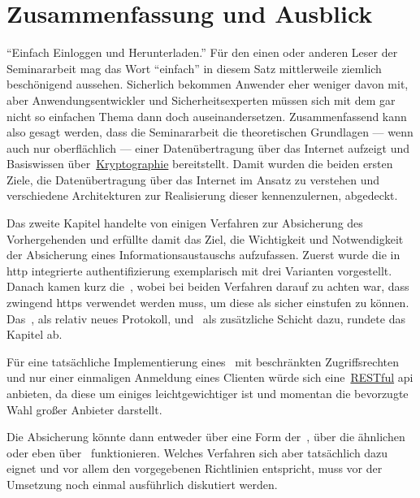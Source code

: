 \section{Zusammenfassung und Ausblick}\label{sec:zusammenfassung-und-ausblick}
	\enquote{Einfach Einloggen und Herunterladen.}
	Für den einen oder anderen Leser der Seminararbeit mag das Wort \enquote{einfach}
	in diesem Satz mittlerweile ziemlich beschönigend aussehen.
	Sicherlich bekommen Anwender eher weniger davon mit,
	aber Anwendungsentwickler und Sicherheitsexperten müssen sich
	mit dem gar nicht so einfachen Thema dann doch auseinandersetzen.
	Zusammenfassend kann also gesagt werden,
	dass die Seminararbeit die theoretischen Grundlagen
	--- wenn auch nur oberflächlich ---
	einer Datenübertragung über das Internet aufzeigt
	und Basiswissen über~\hyperref[subsec:verschluesselung]{Kryptographie} bereitstellt.
	Damit wurden die beiden ersten Ziele,
	die Datenübertragung über das Internet im Ansatz zu verstehen und
	verschiedene Architekturen zur Realisierung dieser kennenzulernen,
	abgedeckt.

	Das zweite Kapitel handelte von einigen Verfahren zur Absicherung des Vorhergehenden
	und erfüllte damit das Ziel,
	die Wichtigkeit
	und Notwendigkeit der Absicherung eines Informationsaustauschs aufzufassen.
	Zuerst wurde die in \gls{http} integrierte \gls{authentifizierung} exemplarisch mit drei Varianten vorgestellt.
	Danach kamen kurz die~,
	wobei bei beiden Verfahren darauf zu achten war,
	dass zwingend \gls{https} verwendet werden muss,
	um diese als sicher einstufen zu können.
	Das~,
	als relativ neues Protokoll,
	und~ als zusätzliche Schicht dazu,
	rundete das Kapitel ab.

	Für eine tatsächliche Implementierung eines~ mit beschränkten Zugriffsrechten
	und nur einer einmaligen Anmeldung eines Clienten würde sich
	eine~\hyperref[subsec:rest]{RESTful} \gls{api} anbieten,
	da diese um einiges leichtgewichtiger ist
	und momentan die bevorzugte Wahl großer Anbieter darstellt.

	Die Absicherung könnte dann entweder über eine Form der~,
	über die ähnlichen~
	oder eben über~ funktionieren.
	Welches Verfahren sich aber tatsächlich dazu eignet
	und vor allem den vorgegebenen Richtlinien entspricht,
	muss vor der Umsetzung noch einmal ausführlich diskutiert werden.
